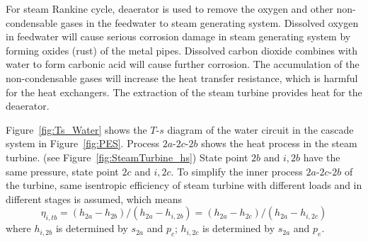  For steam Rankine cycle, deaerator is used to remove the oxygen and other non-condensable gases in the feedwater to steam generating system. Dissolved oxygen in feedwater will cause serious corrosion damage in steam generating system by forming oxides (rust) of the metal pipes. Dissolved carbon dioxide combines with water to form carbonic acid will cause further corrosion. The accumulation of the non-condensable gases will increase the heat transfer resistance, which is harmful for the heat exchangers. The extraction of the steam turbine provides heat for the deaerator.
  
  Figure~\ref{fig:Ts_Water} shows the $T$-$s$ diagram of the water circuit in the cascade system in Figure~\ref{fig:PES}. Process $2a$-$2c$-$2b$ shows the heat process in the steam turbine. (see Figure~\ref{fig:SteamTurbine_hs}) State point $2b$ and $i,2b$ have the same pressure, state point $2c$ and $i,2c$. To simplify the inner process $2a$-$2c$-$2b$ of the turbine, same isentropic efficiency of steam turbine with different loads and in different stages is assumed, which means  
  \begin{equation}
      \eta_{i,tb} =(h_{2a}-h_{2b})/(h_{2a}-h_{i,2b}) = (h_{2a}-h_{2c})/(h_{2a}-h_{i,2c})
\end{equation}
where $h_{i,2b}$ is determined by $s_{2a}$ and $p_c$; $h_{i,2c}$ is determined by $s_{2a}$ and $p_e$.

